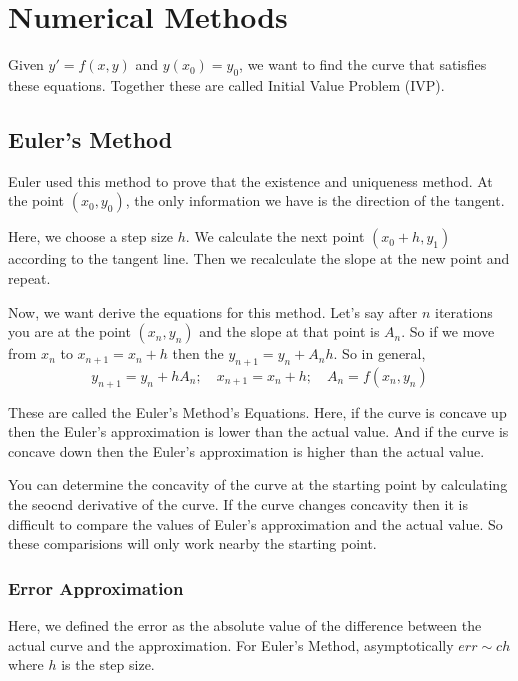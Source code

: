 

\chapter{Numerical Methods}

\bigbreak

Given $y' = f(x, y)$ and $y(x_0) = y_0$, we want to find the curve that satisfies these equations.
Together these are called Initial Value Problem (IVP).

\section{Euler's Method}

Euler used this method to prove that the existence and uniqueness method.
At the point $(x_0, y_0)$, the only information we have is the direction of the tangent.

Here, we choose a step size $h$.
We calculate the next point $(x_0 + h, y_1)$ according to the tangent line.
Then we recalculate the slope at the new point and repeat.

Now, we want derive the equations for this method.
Let's say after $n$ iterations you are at the point $(x_n, y_n)$ and the slope at that point is $A_n$.
So if we move from $x_n$ to $x_{n+1} = x_n + h$ then the $y_{n+1} = y_n + A_n h$.
So in general,
$$ y_{n+1} = y_n + h A_n ; \quad x_{n+1} = x_n + h; \quad A_n = f(x_n, y_n) $$

These are called the Euler's Method's Equations.
Here, if the curve is concave up then the Euler's approximation is lower than the actual value.
And if the curve is concave down then the Euler's approximation is higher than the actual value.

You can determine the concavity of the curve at the starting point by calculating the seocnd derivative of the curve.
If the curve changes concavity then it is difficult to compare the values of Euler's approximation and the actual value.
So these comparisions will only work nearby the starting point.

\subsection{Error Approximation}

Here, we defined the error as the absolute value of the difference between the actual curve and the approximation.
For Euler's Method, asymptotically $err \sim c h$ where $h$ is the step size.

